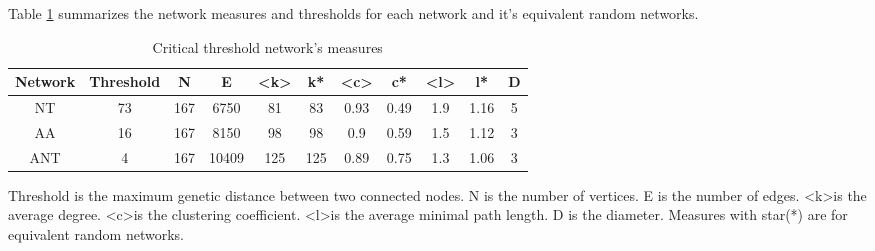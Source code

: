 \documentclass[10pt,letterpaper]{article}
\begin{document}
Table \ref{netmeasures} summarizes the network measures and thresholds for each network and it's equivalent random networks.

\begin{table}[!ht]
\caption{Critical threshold network's measures}
\label{netmeasures}
\begin{tabular}{ccccccccccc}
\hline
{\bf Network} & {\bf Threshold} & {\bf N} & {\bf E} & {\bf \textless k\textgreater} & {\bf k*} & {\bf \textless c\textgreater} & {\bf c*} & {\bf \textless l\textgreater} & {\bf l*} & {\bf D} \\\hline
NT            & 73              & 167     & 6750    & 81                           & 83       & 0.93                         & 0.49     & 1.9                          & 1.16     & 5       \\
AA            & 16              & 167     & 8150    & 98                           & 98       & 0.9                          & 0.59     & 1.5                          & 1.12     & 3       \\
ANT           & 4               & 167     & 10409   & 125                          & 125      & 0.89                         & 0.75     & 1.3                          & 1.06     & 3      \\\hline
\end{tabular}
\begin{flushleft}
Threshold is the maximum genetic distance between two connected nodes. N is the number of vertices. E is the number of edges. \textless k\textgreater is the average degree. \textless c\textgreater is the clustering coefficient. \textless l\textgreater is the average minimal path length. D is the diameter. Measures with star(*) are for equivalent random networks.
\end{flushleft}
\end{table}
\end{document}
